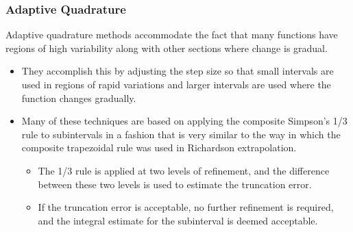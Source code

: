 \documentclass{if-beamer}
\begin{document}
\begin{frame}[t]
	\frametitle{Adaptive Quadrature}
	Adaptive quadrature methods accommodate the fact that many functions have regions of
	high variability along with other sections where change is gradual.
	\begin{itemize}
		\item They accomplish this
		by adjusting the step size so that small intervals are used in regions of rapid variations and
		larger intervals are used where the function changes gradually. \vspace{5pt}
		\item Many of these techniques
		are based on applying the composite Simpson’s 1/3 rule to subintervals in a fashion that
		is very similar to the way in which the composite trapezoidal rule was used in Richardson
		extrapolation. \vspace{5pt}
		\begin{itemize}
			\item The 1/3 rule is applied at two levels of refinement, and the difference
			between these two levels is used to estimate the truncation error. \vspace{3pt}
			\item If the truncation error is
			acceptable, no further refinement is required, and the integral estimate for the subinterval is
			deemed acceptable. \vspace{3pt}
		\end{itemize}
	\end{itemize}
\end{frame}
\end{document}
